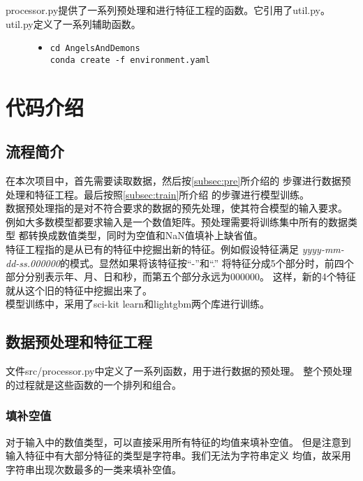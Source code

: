 \documentclass[a4paper]{article}
\begin{document}
processor.py提供了一系列预处理和进行特征工程的函数。它引用了util.py。
util.py定义了一系列辅助函数。
\begin{figure}[!hbt]
\begin{itemize}
\item[] \begin{lstlisting}[style=myshell, label=lst:install, caption=安装环境的方式]
cd AngelsAndDemons
conda create -f environment.yaml
\end{lstlisting}
\end{itemize}
\end{figure}
\section{代码介绍}
\subsection{流程简介}
在本次项目中，首先需要读取数据，然后按\autoref{subsec:pre}所介绍的
步骤进行数据预处理和特征工程。最后按照\autoref{subsec:train}所介绍
的步骤进行模型训练。\\

数据预处理指的是对不符合要求的数据的预先处理，使其符合模型的输入要求。
例如大多数模型都要求输入是一个数值矩阵。预处理需要将训练集中所有的数据类型
都转换成数值类型，同时为空值和NaN值填补上缺省值。\\

特征工程指的是从已有的特征中挖掘出新的特征。例如假设特征满足
\emph{yyyy-mm-dd-ss.000000}的模式。显然如果将该特征按``-''和``.''
将特征分成5个部分时，前四个部分分别表示年、月、日和秒，而第五个部分永远为000000。
这样，新的4个特征就从这个旧的特征中挖掘出来了。\\

模型训练中，采用了sci-kit learn和lightgbm两个库进行训练。

\subsection{数据预处理和特征工程}\label{subsec:pre}
文件src/processor.py中定义了一系列函数，用于进行数据的预处理。
整个预处理的过程就是这些函数的一个排列和组合。

\subsubsection{填补空值}
对于输入中的数值类型，可以直接采用所有特征的均值来填补空值。
但是注意到输入特征中有大部分特征的类型是字符串。我们无法为字符串定义
均值，故采用字符串出现次数最多的一类来填补空值。\\
\end{document}
